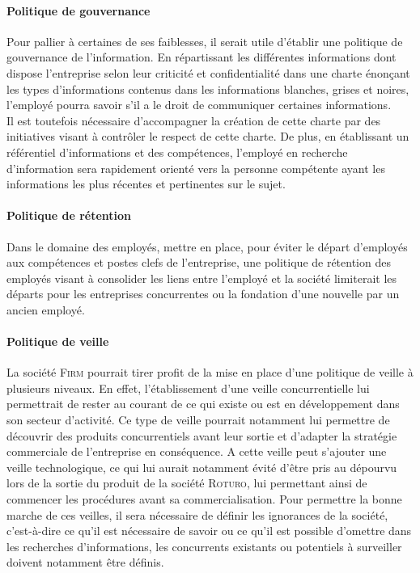 \paragraph{Politique de gouvernance}
Pour pallier à certaines de ses faiblesses, il serait utile d'établir une politique de gouvernance de l'information. En répartissant les différentes informations dont dispose l'entreprise selon leur criticité et confidentialité dans une charte énonçant les types d'informations contenus dans les informations blanches, grises et noires, l'employé pourra savoir s'il a le droit de communiquer certaines informations. \\
Il est toutefois nécessaire d'accompagner la création de cette charte par des initiatives visant à contrôler le respect de cette charte. De plus, en établissant un référentiel d'informations et des compétences, l'employé en recherche d'information sera rapidement orienté vers la personne compétente ayant les informations les plus récentes et pertinentes sur le sujet. 
\paragraph{Politique de rétention}
Dans le domaine des employés, mettre en place, pour éviter le départ d'employés aux compétences et postes clefs de l'entreprise, une politique de rétention des employés visant à consolider les liens entre l'employé et la société limiterait les départs pour les entreprises concurrentes ou la fondation d'une nouvelle par un ancien employé.
\paragraph{Politique de veille}
La société \textsc{Firm} pourrait tirer profit de la mise en place d'une politique de veille à plusieurs niveaux. En effet, l'établissement d'une veille concurrentielle lui permettrait de rester au courant de ce qui existe ou est en développement dans son secteur d'activité. Ce type de veille pourrait notamment lui permettre de découvrir des produits concurrentiels avant leur sortie et d'adapter la stratégie commerciale de l'entreprise en conséquence. A cette veille peut s'ajouter une veille technologique, ce qui lui aurait notamment évité d'être pris au dépourvu lors de la sortie du produit de la société \textsc{Roturo}, lui permettant ainsi de commencer les procédures avant sa commercialisation. Pour permettre la bonne marche de ces veilles, il sera nécessaire de définir les ignorances de la société, c'est-à-dire ce qu'il est nécessaire de savoir ou ce qu'il est possible d'omettre dans les recherches d'informations, les concurrents existants ou potentiels à surveiller doivent notamment être définis.
